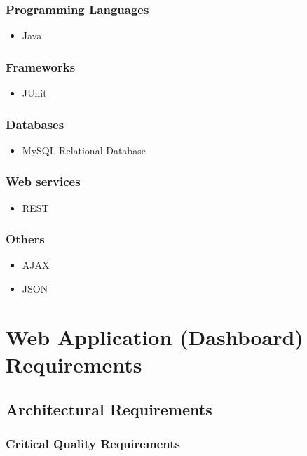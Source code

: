 	\subsubsection{Programming Languages}
	\begin{itemize}
	\item Java
	\end{itemize}
	\subsubsection{Frameworks}
	\begin{itemize}
	\item JUnit
	\end{itemize}
	\subsubsection{Databases}
	\begin{itemize}
	\item MySQL Relational Database
	\end{itemize}
	\subsubsection{Web services}
	\begin{itemize}
	\item REST
	\end{itemize}
	\subsubsection{Others}
	\begin{itemize}
	\item AJAX
	\item JSON
	\end{itemize}		
	
\newpage
\section{Web Application (Dashboard) Requirements}
\subsection{Architectural Requirements}
		\subsubsection{Critical Quality Requirements} 
